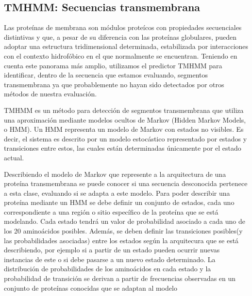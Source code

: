   
  
  
  
  
\subsection{TMHMM: Secuencias transmembrana} \label{tmhmm}

Las proteínas de membrana son módulos proteícos con propiedades secuenciales distintivas y que, a pesar de su diferencia con las proteínas globulares, 
pueden adoptar una estructura tridimensional determinada, estabilizada por interacciones con el contexto hidrofóbico en el que normalmente se encuentran.
Teniendo en cuenta este panorama más amplio, utilizamos el predictor TMHMM \cite{krogh2001predicting} para identificar, dentro de la secuencia que estamos evaluando, segmentos transmembrana ya que probablemente no hayan sido detectados por otros métodos de nuestra evaluación.

TMHMM es un método para detección de segmentos transmembrana que utiliza una aproximación mediante modelos ocultos de Markov (Hidden Markov Models, o HMM).
Un HMM representa un modelo de Markov con estados no visibles. Es decir, el sistema es descrito por un modelo estocástico representado por estados y transiciones entre estos, las cuales están determinadas únicamente por el estado actual.

Describiendo el modelo de Markov que represente a la arquitectura de una proteína transmembrana se puede conocer si una secuencia desconocida pertenece a esta clase, evaluando si se adapta a este modelo.
Para poder describir una proteína mediante un HMM se debe definir un conjunto de estados, cada uno correspondiente a una región o sitio específico de la proteína que se está modelando.
Cada estado tendrá un valor de probabilidad asociado a cada uno de los 20 aminoácidos posibles. Además, se deben definir las transiciones posibles(y las probabilidades asociadas) entre los estados según la arquitecura que se está describiendo, por ejemplo si a partir 
de un estado pueden ocurrir nuevas instancias de este o si debe pasarse a un nuevo estado determinado.
La distribución de probabilidades de los aminoácidos en cada estado y la probabilidad de transición se derivan a partir de frecuencias observadas en un conjunto de proteínas conocidas que se adaptan al modelo

